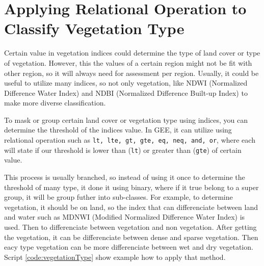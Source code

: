 \section{Applying Relational Operation to Classify Vegetation Type}
Certain value in vegetation indices could determine the type of land cover or type of vegetation. However, this the values of a certain region might not be fit with other region, so it will always need for assessment per region. Usually, it could be useful to utilize many indices, so not only vegetation, like NDWI (Normalized Difference Water Index) and NDBI (Normalized Difference Built-up Index) to make more diverse classification.

To mask or group certain land cover or vegetation type using indices, you can determine the threshold of the indices value. In GEE, it can utilize using relational operation such as \verb|lt, lte, gt, gte, eq, neq, and, or|, where each will state if our threshold is lower than (\verb|lt|) or greater than (\verb|gte|) of certain value. 

This process is usually branched, so instead of using it once to determine the threshold of many type, it done it using binary, where if it true belong to a super group, it will be group futher into sub-classes. For example, to determine vegetation, it should be on land, so the index that can differenciate between land and water such as MDNWI (Modified Normalized Difference Water Index) is used. Then to differenciate between vegetation and non vegetation. After getting the vegetation, it can be differenciate between dense and sparse vegetation. Then eacy type vegetation can be more differenciate between wet and dry vegetation. Script \ref{code:vegetationType} show example how to apply that method.

